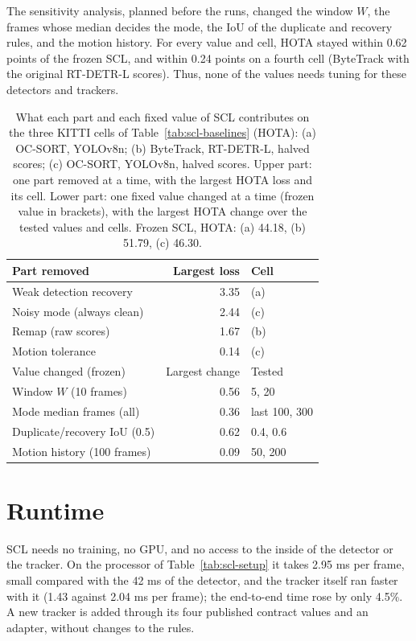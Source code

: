 The sensitivity analysis, planned before the runs, changed the window $W$, the frames whose median decides the mode, the IoU of the duplicate and recovery rules, and the motion history. For every value and cell, HOTA stayed within 0.62 points of the frozen SCL, and within 0.24 points on a fourth cell (ByteTrack with the original RT-DETR-L scores). Thus, none of the values needs tuning for these detectors and trackers.

\begin{table}[tbp]
\centering
\caption{What each part and each fixed value of SCL contributes on the three KITTI cells of Table~\ref{tab:scl-baselines} (HOTA): (a) OC-SORT, YOLOv8n; (b) ByteTrack, RT-DETR-L, halved scores; (c) OC-SORT, YOLOv8n, halved scores. Upper part: one part removed at a time, with the largest HOTA loss and its cell. Lower part: one fixed value changed at a time (frozen value in brackets), with the largest HOTA change over the tested values and cells. Frozen SCL, HOTA: (a) 44.18, (b) 51.79, (c) 46.30.}
\label{tab:scl-parts}
\begin{tabular}{lrl}
\toprule
Part removed & Largest loss & Cell\\
\midrule
Weak detection recovery & 3.35 & (a)\\
Noisy mode (always clean) & 2.44 & (c)\\
Remap (raw scores) & 1.67 & (b)\\
Motion tolerance & 0.14 & (c)\\
\midrule
Value changed (frozen) & Largest change & Tested\\
\midrule
Window $W$ (10 frames) & 0.56 & 5, 20\\
Mode median frames (all) & 0.36 & last 100, 300\\
Duplicate/recovery IoU (0.5) & 0.62 & 0.4, 0.6\\
Motion history (100 frames) & 0.09 & 50, 200\\
\bottomrule
\end{tabular}
\end{table}

\section{Runtime}\label{sec:scl-runtime}
SCL needs no training, no GPU, and no access to the inside of the detector or the tracker. On the processor of Table~\ref{tab:scl-setup} it takes 2.95 ms per frame, small compared with the 42 ms of the detector, and the tracker itself ran faster with it (1.43 against 2.04 ms per frame); the end-to-end time rose by only 4.5\%. A new tracker is added through its four published contract values and an adapter, without changes to the rules.


